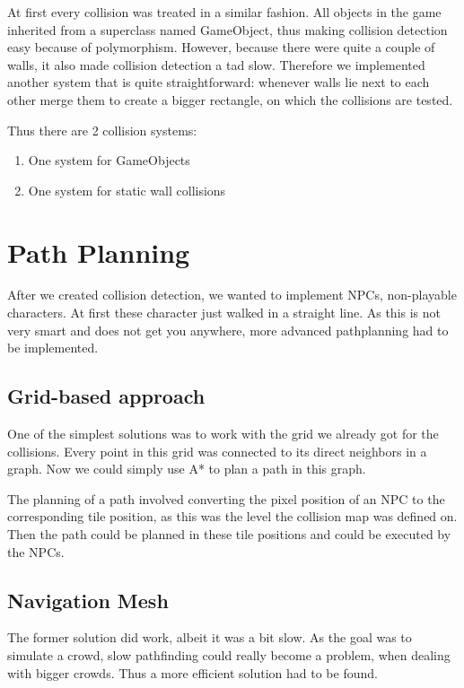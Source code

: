 \documentclass[a4paper,pdf,12pt]{article}
\begin{document}
At first every collision was treated in a similar fashion. All objects in the game inherited from a superclass named GameObject, thus making collision detection easy because of polymorphism. However, because there were quite a couple of walls, it also made collision detection a tad slow. Therefore we implemented another system that is quite straightforward: whenever walls lie next to each other merge them to create a bigger rectangle, on which the collisions are tested.

Thus there are 2 collision systems:
\begin{enumerate}
\item One system for GameObjects
\item One system for static wall collisions
\end{enumerate}

\section{Path Planning}
\label{sec:Path Planning}

After we created collision detection, we wanted to implement NPCs, non-playable characters. At first these character just walked in a straight line. As this is not very smart and does not get you anywhere, more advanced pathplanning had to be implemented. 

\subsection{Grid-based approach}
One of the simplest solutions was to work with the grid we already got for the collisions. Every point in this grid was connected to its direct neighbors in a graph. Now we could simply use A* to plan a path in this graph. 

The planning of a path involved converting the pixel position of an NPC to the corresponding tile position, as this was the level the collision map was defined on. Then the path could be planned in these tile positions and could be executed by the NPCs.

\subsection{Navigation Mesh}
The former solution did work, albeit it was a bit slow. As the goal was to simulate a crowd, slow pathfinding could really become a problem, when dealing with bigger crowds. Thus a more efficient solution had to be found.
\end{document}
